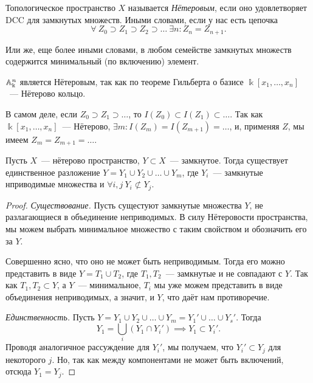 	\begin{definition} 
		Топологическое пространство $X$ называется \emph{Нётеровым}, если оно удовлетворяет $\mathrm{DCC}$ для замкнутых множеств. Иными словами, если у нас есть цепочка 
		\[
			\forall \ Z_0 \supset Z_1 \supset Z_2 \supset \ldots  \ \exists n \colon Z_n = Z_{n + 1}. 
		\]

		Или же, еще более иными словами, в любом семействе замкнутых множеств содержится минимальный (по включению) элемент. 
	\end{definition}

	\begin{example}
		$\AA_{\Bbbk}^n$ является Нётеровым, так как по теореме Гильберта о базисе $\Bbbk[x_1, \ldots, x_n]$~--- Нётерово кольцо. 

		В самом деле, если $Z_0 \supset Z_1 \supset \ldots$, то $I(Z_0) \subset I(Z_1) \subset \ldots$. Так как $\Bbbk[x_1, \ldots, x_n]$~--- Нётерово, $\exists m\colon I(Z_m) = I(Z_{m + 1}) = \ldots$, и, применяя $Z$, мы имеем $Z_m = Z_{m + 1} = \ldots$. 
	\end{example}

	\begin{theorem}[] 
		Пусть $X$~--- нётерово пространство, $Y \subset X$~--- замкнутое. Тогда существует единственное разложение $Y = Y_1 \cup Y_2 \cup \ldots \cup Y_m$, где $Y_i$~--- замкнутые нприводимые множества и $\forall i, j \ Y_i \not\subset Y_j$. 
	\end{theorem}
	\begin{proof}
		\emph{Существование.} Пусть сущестуют замкнутые множества $Y$, не разлагающиеся в объединение неприводимых. В силу Нётеровости пространства, мы можем выбрать минимальное множество с таким свойством и обозначить его за $Y$.

		Совершенно ясно, что оно не может быть неприводимым. Тогда его можно представить в виде $Y = T_1 \cup T_2$, где $T_1, T_2$~--- замкнутые и не совпадают с $Y$. Так как $T_1, T_2 \subset Y$, а $Y$~--- минимальное, $T_i$ мы уже можем представить в виде объединения неприводимых, а значит, и $Y$, что даёт нам противоречие. 

		\emph{Единственность.} Пусть $Y = Y_1 \cup Y_2 \cup \ldots \cup Y_m = Y_1' \cup \ldots \cup Y_s'$. Тогда 
		\[
			Y_1 = \bigcup_{i} (Y_1 \cap Y_i') \implies Y_1 \subset Y_i'.
		\]
		Проводя аналогичное рассуждение для $Y_i'$, мы получаем, что $Y_i' \subset Y_j$ для некоторого $j$. Но, так как между компонентами не может быть включений, отсюда $Y_1 = Y_j$.
	\end{proof}


